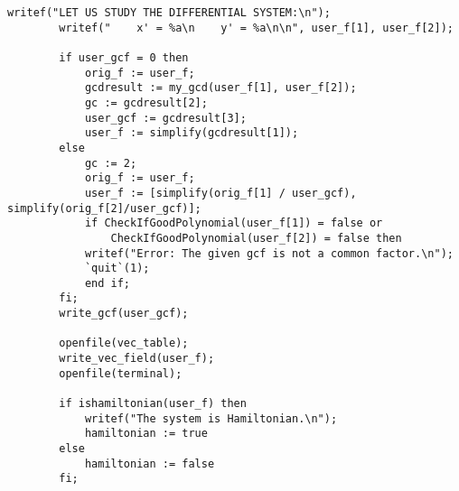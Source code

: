 \documentclass[a4paper,10pt]{article}
\begin{document}
\begin{lstlisting}[name=main]
        writef("LET US STUDY THE DIFFERENTIAL SYSTEM:\n");
        writef("    x' = %a\n    y' = %a\n\n", user_f[1], user_f[2]);

        if user_gcf = 0 then
            orig_f := user_f;
            gcdresult := my_gcd(user_f[1], user_f[2]);
            gc := gcdresult[2];
            user_gcf := gcdresult[3];
            user_f := simplify(gcdresult[1]);
        else
            gc := 2;
            orig_f := user_f;
            user_f := [simplify(orig_f[1] / user_gcf), simplify(orig_f[2]/user_gcf)];
            if CheckIfGoodPolynomial(user_f[1]) = false or
                CheckIfGoodPolynomial(user_f[2]) = false then
            writef("Error: The given gcf is not a common factor.\n");
            `quit`(1);
            end if;
        fi;
        write_gcf(user_gcf);

        openfile(vec_table);
        write_vec_field(user_f);
        openfile(terminal);

        if ishamiltonian(user_f) then
            writef("The system is Hamiltonian.\n");
            hamiltonian := true
        else
            hamiltonian := false
        fi;


\end{lstlisting}
\end{document}
